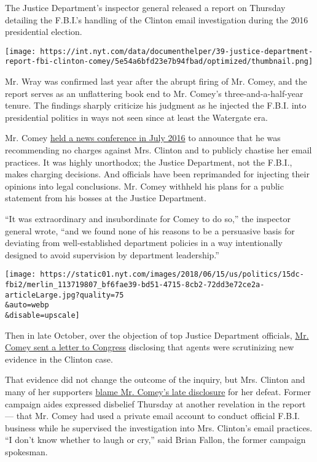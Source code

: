 The Justice Department's inspector general released a report on Thursday
detailing the F.B.I.'s handling of the Clinton email investigation
during the 2016 presidential election.

\texttt{[image: https://int.nyt.com/data/documenthelper/39-justice-department-report-fbi-clinton-comey/5e54a6bfd23e7b94fbad/optimized/thumbnail.png]}

Mr. Wray was confirmed last year after the abrupt firing of Mr. Comey,
and the report serves as an unflattering book end to Mr. Comey's
three-and-a-half-year tenure. The findings sharply criticize his
judgment as he injected the F.B.I. into presidential politics in ways
not seen since at least the Watergate era.

Mr. Comey
\href{https://www.nytimes.com/2016/07/06/us/politics/hillary-clinton-fbi-email-comey.html}{held
a news conference in July 2016} to announce that he was recommending no
charges against Mrs. Clinton and to publicly chastise her email
practices. It was highly unorthodox; the Justice Department, not the
F.B.I., makes charging decisions. And officials have been reprimanded
for injecting their opinions into legal conclusions. Mr. Comey withheld
his plans for a public statement from his bosses at the Justice
Department.

``It was extraordinary and insubordinate for Comey to do so,'' the
inspector general wrote, ``and we found none of his reasons to be a
persuasive basis for deviating from well-established department policies
in a way intentionally designed to avoid supervision by department
leadership.''

\texttt{[image: https://static01.nyt.com/images/2018/06/15/us/politics/15dc-fbi2/merlin\_113719807\_bf6fae39-bd51-4715-8cb2-72dd3e72ce2a-articleLarge.jpg?quality=75\\\&auto=webp\\\&disable=upscale]}

Then in late October, over the objection of top Justice Department
officials,
\href{https://www.nytimes.com/2016/10/29/us/politics/fbi-hillary-clinton-email.html}{Mr.
Comey sent a letter to Congress} disclosing that agents were
scrutinizing new evidence in the Clinton case.

That evidence did not change the outcome of the inquiry, but Mrs.
Clinton and many of her supporters
\href{https://www.nytimes.com/2016/11/13/us/politics/hillary-clinton-james-comey.html}{blame
Mr. Comey's late disclosure} for her defeat. Former campaign aides
expressed disbelief Thursday at another revelation in the report ---
that Mr. Comey had used a private email account to conduct official
F.B.I. business while he supervised the investigation into Mrs.
Clinton's email practices. ``I don't know whether to laugh or cry,''
said Brian Fallon, the former campaign spokesman.

